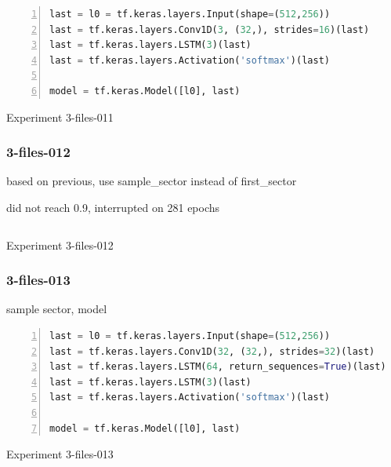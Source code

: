 

\noindent
\begin{algorithm}
\begin{lstlisting}[language=Python, frame=single, numbers=left]
last = l0 = tf.keras.layers.Input(shape=(512,256))
last = tf.keras.layers.Conv1D(3, (32,), strides=16)(last)
last = tf.keras.layers.LSTM(3)(last)
last = tf.keras.layers.Activation('softmax')(last)

model = tf.keras.Model([l0], last)
\end{lstlisting}
\caption{\label{alg:3-files-011}Experiment 3-files-011}
\end{algorithm}

\subsubsection{3-files-012}

based on previous, use sample\_sector instead of first\_sector

did not reach 0.9, interrupted on 281 epochs



\noindent
\begin{algorithm}
\begin{lstlisting}[language=Python, frame=single, numbers=left]
\end{lstlisting}
\caption{\label{alg:3-files-012}Experiment 3-files-012}
\end{algorithm}


\subsubsection{3-files-013}

sample sector, model




\noindent
\begin{algorithm}
\begin{lstlisting}[language=Python, frame=single, numbers=left]
last = l0 = tf.keras.layers.Input(shape=(512,256))
last = tf.keras.layers.Conv1D(32, (32,), strides=32)(last)
last = tf.keras.layers.LSTM(64, return_sequences=True)(last)
last = tf.keras.layers.LSTM(3)(last)
last = tf.keras.layers.Activation('softmax')(last)

model = tf.keras.Model([l0], last)
\end{lstlisting}
\caption{\label{alg:3-files-013}Experiment 3-files-013}
\end{algorithm}

